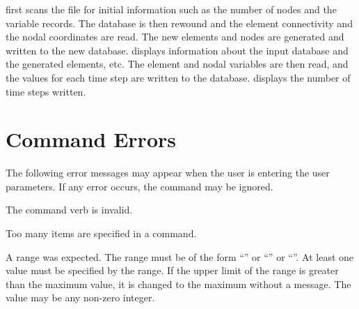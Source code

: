 \caps{\PROGRAM} first scans the  file for initial
information such as the number of nodes and the variable records. The
database is then rewound and the element connectivity and the nodal
coordinates are read. The new elements and nodes are generated and
written to the new  database. \caps{\PROGRAM} displays
information about the input database and the generated elements, etc.
The element and nodal variables are then read, and the values for each
time step are written to the  database. \caps{\PROGRAM}
displays the number of time steps written.

\section{Command Errors} \label{output:cmderr}

The following error messages may appear when the user is entering the
user parameters. If any error occurs, the command may be ignored.

{
The command {verb} is invalid.
}

{
Too many items are specified in a command.
}

{
A range was expected. The range must be of the form ``'' or
``'' or
``''. At least one
value must be specified by the range. If the upper limit of the range is
greater than the maximum value, it is changed to the maximum without a
message. The  value may be any non-zero integer.
}

